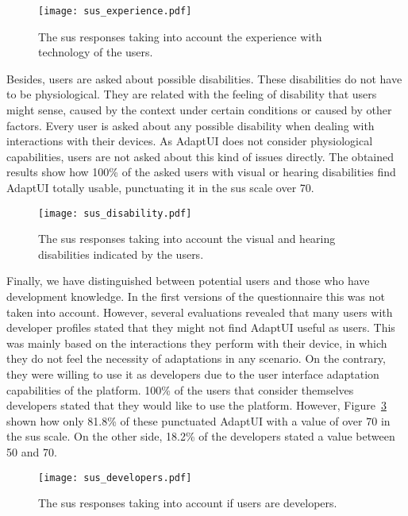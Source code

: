 \begin{figure}
\centering
\texttt{[image: sus\_experience.pdf]}
\caption{The \ac{sus} responses taking into account the experience with technology
of the users.}
\label{fig:sus_experience}
\end{figure}

Besides, users are asked about possible disabilities. These disabilities do not
have to be physiological. They are related with the feeling of disability that
users might sense, caused by the context under certain conditions or caused by
other factors. Every user is asked about any possible disability when dealing
with interactions with their devices. As AdaptUI does not consider physiological
capabilities, users are not asked about this kind of issues directly. The
obtained results show how 100\% of the asked users with visual or hearing
disabilities find AdaptUI totally usable, punctuating it in the \ac{sus} scale over
70.

\begin{figure}
\centering
\texttt{[image: sus\_disability.pdf]}
\caption{The \ac{sus} responses taking into account the visual and hearing 
disabilities indicated by the users.}
\label{fig:sus_disability}
\end{figure}

Finally, we have distinguished between potential users and those who have
development knowledge. In the first versions of the questionnaire this was not
taken into account. However, several evaluations revealed that many users with 
developer profiles stated that they might not find AdaptUI useful as users. This
was mainly based on the interactions they perform with their device, in which they
do not feel the necessity of adaptations in any scenario. On the contrary, they 
were willing to use it as developers due to the user 
interface adaptation capabilities of the platform. 100\% of the users that 
consider themselves developers stated that they would like to use the platform. 
However, Figure~\ref{fig:sus_developers} shown how only 81.8\% of these 
punctuated AdaptUI with a value of over 70 in the \ac{sus} scale. On the other 
side, 18.2\% of the developers stated a value between 50 and 70.

\begin{figure}
\centering
\texttt{[image: sus\_developers.pdf]}
\caption{The \ac{sus} responses taking into account if users are developers.}
\label{fig:sus_developers}
\end{figure}

